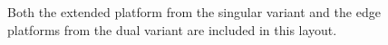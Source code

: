 \begin{figure}[h!]
    \centering
    \caption{Both the extended platform from the singular variant and the edge platforms from the dual variant are included in this layout.}
\end{figure}